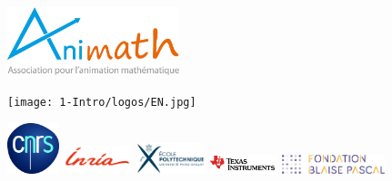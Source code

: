 \begin{figure}[h!]
	
	\vspace{1cm}
	
	\centering
  \begin{minipage}[c]{4cm}
     \centering
	   \includegraphics[width=5cm]{1-Intro/logos/animath.jpg}
   \end{minipage}
   
   \vspace{2cm}

   \begin{minipage}[c]{4cm}
   \centering
        \texttt{[image: 1-Intro/logos/EN.jpg]}
   \end{minipage} \hfill
   \begin{minipage}[c]{2cm}
   \centering
      \includegraphics[width=1.5cm]{1-Intro/logos/cnrs.jpg}
   \end{minipage} \hfill \hskip 1cm
   \begin{minipage}[c]{2cm}
   \centering
      \includegraphics[width=2cm]{1-Intro/logos/inria.png}
   \end{minipage}
   
   \bigskip

   \begin{minipage}[c]{2cm}
   \centering
   \includegraphics[width=2cm]{1-Intro/logos/polytechnique.jpg}
   \end{minipage} \hskip 2cm \hfill
      \begin{minipage}[c]{2cm}
   \centering
        \includegraphics[width=2cm]{1-Intro/logos/texas.jpg}
   \end{minipage} \hfill
   \begin{minipage}[c]{3cm}
   \centering
      \includegraphics[width=3cm]{1-Intro/logos/fondation_blaise_pascal.jpg}
   \end{minipage} 
   

\end{figure}
